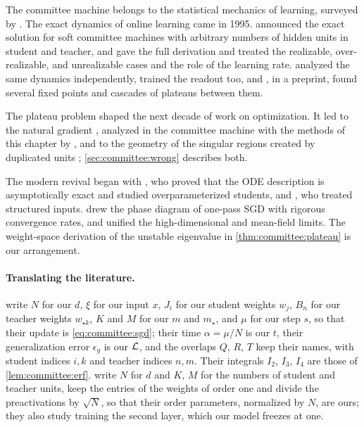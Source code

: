 \begin{refsection}
\notesandrefs
The committee machine belongs to the statistical mechanics of learning, surveyed by \textcite{EngelVandenBroeck2001}. The exact dynamics of online learning came in 1995. \Textcite{SaadSolla1995} announced the exact solution for soft committee machines with arbitrary numbers of hidden units in student and teacher, and \textcite{SaadSolla1995b} gave the full derivation and treated the realizable, over-realizable, and unrealizable cases and the role of the learning rate. \Textcite{BiehlSchwarze1995} analyzed the same dynamics independently, \textcite{RieglerBiehl1995} trained the readout too, and \textcite{BiehlRieglerWohler1996}, in a preprint, found several fixed points and cascades of plateaus between them.

The plateau problem shaped the next decade of work on optimization. It led to the natural gradient \parencite{Amari1998}, analyzed in the committee machine with the methods of this chapter by \textcite{RattraySaad1999}, and to the geometry of the singular regions created by duplicated units \parencite{FukumizuAmari2000,AmariParkOzeki2006,CousseauOzekiAmari2008}; \cref{sec:committee:wrong} describes both.

The modern revival began with \textcite{GoldtEtAl2019}, who proved that the ODE description is asymptotically exact and studied overparameterized students, and \textcite{GoldtEtAl2020}, who treated structured inputs. \Textcite{VeigaEtAl2022} drew the phase diagram of one-pass SGD with rigorous convergence rates, and \textcite{ArnaboldiStephanKrzakalaLoureiro2023} unified the high-dimensional and mean-field limits. The weight-space derivation of the unstable eigenvalue in \cref{thm:committee:plateau} is our arrangement.

\paragraph{Translating the literature.}
\Textcite{SaadSolla1995b} write $N$ for our $d$, $\xi$ for our input $x$, $J_i$ for our student weights $w_j$, $B_n$ for our teacher weights $w_{\star k}$, $K$ and $M$ for our $m$ and $m_\star$, and $\mu$ for our step $s$, so that their update is \eqref{eq:committee:sgd}; their time $\alpha=\mu/N$ is our $t$, their generalization error $\epsilon_g$ is our $\mathcal{L}$, and the overlaps $Q$, $R$, $T$ keep their names, with student indices $i,k$ and teacher indices $n,m$. Their integrals $I_2$, $I_3$, $I_4$ are those of \cref{lem:committee:erf}. \Textcite{GoldtEtAl2019} write $N$ for $d$ and $K$, $M$ for the numbers of student and teacher units, keep the entries of the weights of order one and divide the preactivations by $\sqrt N$, so that their order parameters, normalized by $N$, are ours; they also study training the second layer, which our model freezes at one.

\printchapterbib
\end{refsection}
